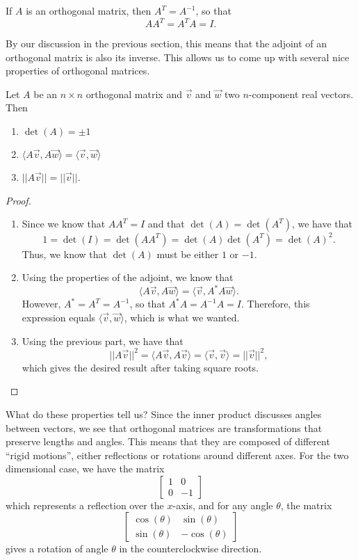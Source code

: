 \begin{theorem1}{}
If $A$ is an orthogonal matrix, then $A^T = A^{-1}$, so that \[ AA^T = A^TA = I. \]
\end{theorem1} 

By our discussion in the previous section, this means that the adjoint of an orthogonal matrix is also its inverse. This allows us to come up with several nice properties of orthogonal matrices.

\begin{theorem1}{}
Let $A$ be an $n\times n$ orthogonal matrix and $\vec{v}$ and $\vec{w}$ two $n$-component real vectors. Then
\begin{enumerate}
\item $\det(A) = \pm1$
\item $\langle A\vec{v}, A\vec{w} \rangle = \langle \vec{v}, \vec{w} \rangle$
\item $||A\vec{v}|| = ||\vec{v}||$.
\end{enumerate}
\end{theorem1}

\begin{proof}
\begin{enumerate}
\item Since we know that $AA^T = I$ and that $\det(A) = \det(A^T)$, we have that
\[ 1 = \det(I) = \det(AA^T) = \det(A)\det(A^T) = \det(A)^2.\] Thus, we know that $\det(A)$ must be either $1$ or $-1$. 
\item Using the properties of the adjoint, we know that
\[ \langle A \vec{v}, A\vec{w} \rangle = \langle \vec{v}, A^*A\vec{w} \rangle. \] However, $A^* = A^T = A^{-1}$, so that $A^*A = A^{-1}A = I$. Therefore, this expression equals $\langle \vec{v}, \vec{w} \rangle$, which is what we wanted.
\item Using the previous part, we have that
\[ ||A\vec{v}||^2 = \langle A\vec{v}, A\vec{v} \rangle = \langle \vec{v}, \vec{v} \rangle = ||\vec{v}||^2, \] which gives the desired result after taking square roots.
\end{enumerate}
\end{proof}

What do these properties tell us? Since the inner product discusses angles between vectors, we see that orthogonal matrices are transformations that preserve lengths and angles. This means that they are composed of different ``rigid motions'', either reflections or rotations around different axes. For the two dimensional case, we have the matrix
\[ \begin{bmatrix} 1 & 0 \\ 0 & -1 \end{bmatrix} \] which represents a reflection over the $x$-axis, and for any angle $\theta$, the matrix
\[ \begin{bmatrix} \cos(\theta) & \sin(\theta) \\ \sin(\theta) & -\cos(\theta) \end{bmatrix} \] gives a rotation of angle $\theta$ in the counterclockwise direction.

